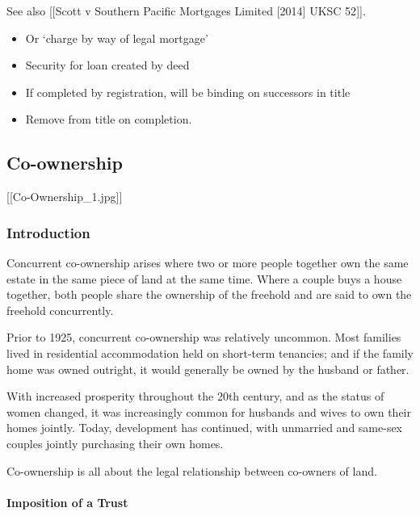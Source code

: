 \documentclass[
]{article}
\providecommand{\tightlist}{%
  \setlength{\itemsep}{0pt}\setlength{\parskip}{0pt}}
\begin{document}
See also {[}{[}Scott v Southern Pacific Mortgages Limited {[}2014{]}
UKSC 52{]}{]}.

\begin{itemize}
\tightlist
\item
  Or `charge by way of legal mortgage'
\item
  Security for loan created by deed
\item
  If completed by registration, will be binding on successors in title
\item
  Remove from title on completion.
\end{itemize}

\hypertarget{co-ownership}{%
\subsection{Co-ownership}\label{co-ownership}}

{[}{[}Co-Ownership\_1.jpg{]}{]}

\hypertarget{introduction-2}{%
\subsubsection{Introduction}\label{introduction-2}}

Concurrent co-ownership arises where two or more people together own the
same estate in the same piece of land at the same time. Where a couple
buys a house together, both people share the ownership of the freehold
and are said to own the freehold concurrently.

Prior to 1925, concurrent co-ownership was relatively uncommon. Most
families lived in residential accommodation held on short-term
tenancies; and if the family home was owned outright, it would generally
be owned by the husband or father.

With increased prosperity throughout the 20th century, and as the status
of women changed, it was increasingly common for husbands and wives to
own their homes jointly. Today, development has continued, with
unmarried and same-sex couples jointly purchasing their own homes.

Co-ownership is all about the legal relationship between co-owners of
land.

\hypertarget{imposition-of-a-trust}{%
\paragraph{Imposition of a Trust}\label{imposition-of-a-trust}}
\end{document}
